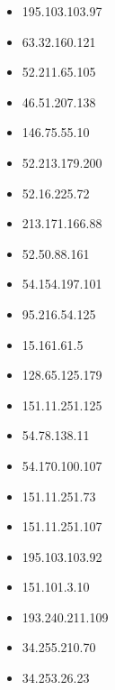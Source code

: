 \documentclass{article}
\begin{document}
\begin{itemize}
        \item 195.103.103.97
    
        \item 63.32.160.121
    
        \item 52.211.65.105
    
        \item 46.51.207.138
    
        \item 146.75.55.10
    
        \item 52.213.179.200
    
        \item 52.16.225.72
    
        \item 213.171.166.88
    
        \item 52.50.88.161
    
        \item 54.154.197.101
    
        \item 95.216.54.125
    
        \item 15.161.61.5
    
        \item 128.65.125.179
    
        \item 151.11.251.125
    
        \item 54.78.138.11
    
        \item 54.170.100.107
    
        \item 151.11.251.73
    
        \item 151.11.251.107
    
        \item 195.103.103.92
    
        \item 151.101.3.10
    
        \item 193.240.211.109
    
        \item 34.255.210.70
    
        \item 34.253.26.23
    

\end{itemize}
\end{document}
